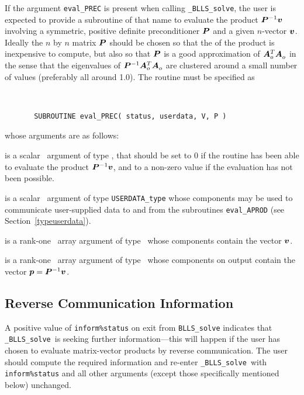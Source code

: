 \documentclass{galahad}
\newcommand{\packagename}{BLLS}
\newcommand{\fullpackagename}{\libraryname\_\packagename}
\newcommand{\solver}{{\tt \fullpackagename\_solve}}
\begin{document}
If the argument {\tt eval\_PREC} is present when calling \solver, the
user is expected to provide a subroutine of that name to evaluate the
product ${\bm{P}}^{-1} {\bm{v}}$ involving a symmetric, positive definite 
preconditioner ${\bm{P}}$ and a given $n$-vector ${\bm{v}}$.
Ideally the $n$ by $n$ matrix ${\bm{P}}$ should be chosen so that the
of the product is inexpensive to compute, but also so that ${\bm{P}}$ is
a good approximation of ${\bm{A}}_o^T {\bm{A}}_o^{}$ in the sense that the eigenvalues
of ${\bm{P}}^{-1} {\bm{A}}_o^T {\bm{A}}_o^{}$ are clustered around a small number of values
(preferably all around 1.0). The routine must be specified as

\def\baselinestretch{0.8}
{\tt
\begin{verbatim}
       SUBROUTINE eval_PREC( status, userdata, V, P )
\end{verbatim} }
\def\baselinestretch{1.0}
\noindent whose arguments are as follows:

\begin{description}
 is a scalar \intentout\ argument of type \integer,
that should be set to 0 if the routine has been able to evaluate the
product ${\bm{P}}^{-1} {\bm{v}}$, 
and to a non-zero value if the evaluation has not been possible.

 is a scalar \intentinout\ argument of type
{\tt USERDATA\_type} whose components may be used
to communicate user-supplied data to and from the subroutines
{\tt eval\_APROD}
(see Section~\ref{typeuserdata}).

 is a rank-one \intentin\ array argument of type \realdp\
whose components contain the vector ${\bm{v}}$.

 is a rank-one \intentinout\ array argument of type \realdp\
whose components on output contain the vector ${\bm{p}} = {\bm{P}}^{-1} {\bm{v}}$.

\end{description}



\subsection{\label{reverse}Reverse Communication Information}

A positive value of {\tt inform\%status} on exit from
{\tt \packagename\_solve}
indicates that
\solver\ is seeking further information---this will happen
if the user has chosen to evaluate matrix-vector products by
reverse communication.
The user should compute the required information and re-enter \solver\
with {\tt inform\%status} and all other arguments (except those specifically
mentioned below) unchanged.
\end{document}
